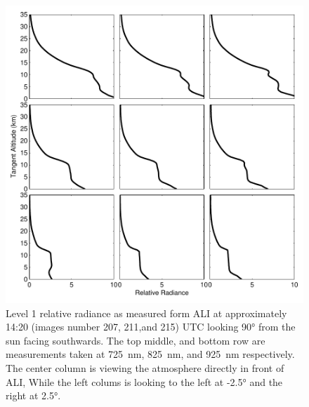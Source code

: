 \documentclass[12pt]{article}
\begin{document}
\begin{figure}
\includegraphics[width=1.0\textwidth]{./Images/AliRadiances.pdf}
    \caption[ALI Radiances]{Level 1 relative radiance as measured form ALI at approximately 14:20 (images number 207, 211,and 215) UTC looking 90\si{\degree} from the sun facing southwards. The top middle, and bottom row are measurements taken at 725~nm, 825~nm, and 925~nm respectively. The center column is viewing the atmosphere directly in front of ALI, While the left colums is looking to the left at -2.5\si{\degree} and the right at 2.5\si{\degree}. }
    \label{fig:AliRadiances}
\end{figure}
\end{document}
